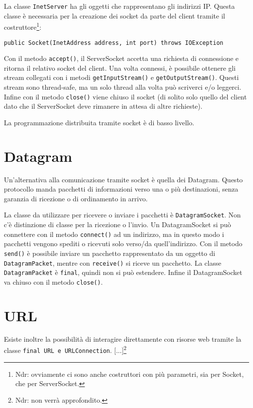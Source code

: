 La classe \texttt{InetServer} ha gli oggetti che rappresentano gli indirizzi IP. Questa classe è necessaria per la creazione dei socket da parte del client tramite il costruttore\footnote{Ndr: ovviamente ci sono anche costruttori con più parametri, sia per Socket, che per ServerSocket.}:
\begin{lstlisting}
public Socket(InetAddress address, int port) throws IOException
\end{lstlisting}
Con il metodo \texttt{accept()}, il ServerSocket accetta una richiesta di connessione e ritorna il relativo socket del client. Una volta connessi, è possibile ottenere gli stream collegati con i metodi \texttt{getInputStream()} e \texttt{getOutputStream()}. Questi stream sono thread-safe, ma un solo thread alla volta può scriverci e/o leggerci. Infine con il metodo \texttt{close()} viene chiuso il socket (di solito solo quello del client dato che il ServerSocket deve rimanere in attesa di altre richieste). 

La programmazione distribuita tramite socket è di basso livello.

\section{Datagram}
Un'alternativa alla comunicazione tramite socket è quella dei Datagram. Questo protocollo manda pacchetti di informazioni verso una o più destinazioni, senza garanzia di ricezione o di ordinamento in arrivo. 

La classe da utilizzare per ricevere o inviare i pacchetti è \texttt{DatagramSocket}. Non c'è distinzione di classe per la ricezione o l'invio. Un DatagramSocket si può connettere con il metodo \texttt{connect()} ad un indirizzo, ma in questo modo i pacchetti vengono spediti o ricevuti solo verso/da quell'indirizzo. Con il metodo \texttt{send()} è possibile inviare un pacchetto rappresentato da un oggetto di \texttt{DatagramPacket}, mentre con \texttt{receive()} si riceve un pacchetto. La classe \texttt{DatagramPacket} è \texttt{final}, quindi non si può estendere. Infine il DatagramSocket va chiuso con il metodo \texttt{close()}.

\section{URL}
Esiste inoltre la possibilità di interagire direttamente con risorse web tramite la classe \texttt{final URL e URLConnection}. [...]\footnote{Ndr: non verrà approfondito.}

